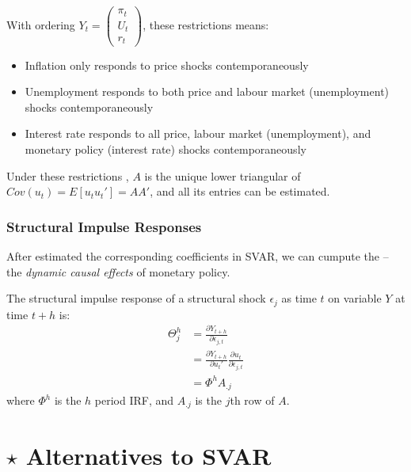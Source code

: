             With ordering $Y_t=\begin{pmatrix}
                \pi_t\\
                U_t\\
                r_t
            \end{pmatrix}$, these restrictions means:
            \begin{itemize}
                \item Inflation only responds to price shocks contemporaneously
                \item Unemployment responds to both price and labour market (unemployment) shocks contemporaneously
                \item Interest rate responds to all price, labour market (unemployment), and monetary policy (interest rate) shocks contemporaneously
            \end{itemize}
            
            Under these restrictions , $A$ is the unique lower triangular  of $Cov(u_t)=E[u_tu_t']=AA'$, and all its entries can be estimated.

        \subsubsection{Structural Impulse Responses}

            After estimated the corresponding coefficients in SVAR, we can cumpute the  -- the \emph{dynamic causal effects} of monetary policy.

            The structural impulse response of a structural shock $\epsilon_j$ as time $t$ on variable $Y$ at time $t+h$ is:
            \begin{align*}
                \Theta_j^h &= \frac{\partial Y_{t+h}}{\partial \epsilon_{j,t}}\\
                &= \frac{\partial Y_{t+h}}{\partial u_t'}\frac{\partial u_t}{\partial \epsilon_{j,t}} \tag{Chain Rule}\\
                &=\Phi^h A_{.j}
            \end{align*}
            where $\Phi^h$ is the $h$ period IRF, and $A_{.j}$ is the $j$th row of $A$.
            
    \section{$\star$ Alternatives to SVAR}
    

